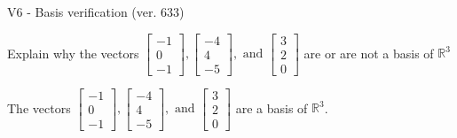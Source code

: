 \begin{exercise}
  \begin{exerciseTitle}V6 - Basis verification (ver. 633)\end{exerciseTitle}
  \begin{exerciseStatement}
    Explain why the vectors \(\left[\begin{array}{r}
-1 \\
0 \\
-1
\end{array}\right] , \left[\begin{array}{r}
-4 \\
4 \\
-5
\end{array}\right] , \text{ and } \left[\begin{array}{r}
3 \\
2 \\
0
\end{array}\right]\) are or are not a basis of \(\mathbb{R}^3\)	


  \end{exerciseStatement}
  \begin{exerciseAnswer}
   The vectors \(\left[\begin{array}{r}
-1 \\
0 \\
-1
\end{array}\right] , \left[\begin{array}{r}
-4 \\
4 \\
-5
\end{array}\right] , \text{ and } \left[\begin{array}{r}
3 \\
2 \\
0
\end{array}\right]\) 
  	 are  a basis of \(\mathbb{R}^3\).
  


  \end{exerciseAnswer}
\end{exercise}
